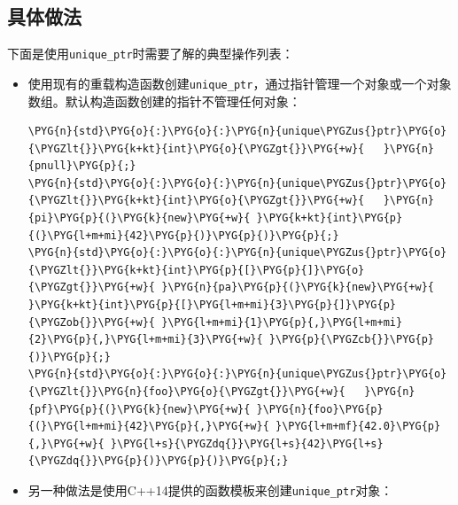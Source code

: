 \subsection{具体做法}



下面是使用\texttt{unique\_\allowbreak{}ptr}时需要了解的典型操作列表：



\begin{itemize}
\item 使用现有的重载构造函数创建\texttt{unique\_\allowbreak{}ptr}，通过指针管理一个对象或一个对象数组。默认构造函数创建的指针不管理任何对象：



\begin{codeblockbg}
\begin{Verbatim}[commandchars=\\\{\},breaklines=true,breakanywhere=true,fontsize=\codefont,xleftmargin=17bp]
\PYG{n}{std}\PYG{o}{:}\PYG{o}{:}\PYG{n}{unique\PYGZus{}ptr}\PYG{o}{\PYGZlt{}}\PYG{k+kt}{int}\PYG{o}{\PYGZgt{}}\PYG{+w}{   }\PYG{n}{pnull}\PYG{p}{;}
\PYG{n}{std}\PYG{o}{:}\PYG{o}{:}\PYG{n}{unique\PYGZus{}ptr}\PYG{o}{\PYGZlt{}}\PYG{k+kt}{int}\PYG{o}{\PYGZgt{}}\PYG{+w}{   }\PYG{n}{pi}\PYG{p}{(}\PYG{k}{new}\PYG{+w}{ }\PYG{k+kt}{int}\PYG{p}{(}\PYG{l+m+mi}{42}\PYG{p}{)}\PYG{p}{)}\PYG{p}{;}
\PYG{n}{std}\PYG{o}{:}\PYG{o}{:}\PYG{n}{unique\PYGZus{}ptr}\PYG{o}{\PYGZlt{}}\PYG{k+kt}{int}\PYG{p}{[}\PYG{p}{]}\PYG{o}{\PYGZgt{}}\PYG{+w}{ }\PYG{n}{pa}\PYG{p}{(}\PYG{k}{new}\PYG{+w}{ }\PYG{k+kt}{int}\PYG{p}{[}\PYG{l+m+mi}{3}\PYG{p}{]}\PYG{p}{\PYGZob{}}\PYG{+w}{ }\PYG{l+m+mi}{1}\PYG{p}{,}\PYG{l+m+mi}{2}\PYG{p}{,}\PYG{l+m+mi}{3}\PYG{+w}{ }\PYG{p}{\PYGZcb{}}\PYG{p}{)}\PYG{p}{;}
\PYG{n}{std}\PYG{o}{:}\PYG{o}{:}\PYG{n}{unique\PYGZus{}ptr}\PYG{o}{\PYGZlt{}}\PYG{n}{foo}\PYG{o}{\PYGZgt{}}\PYG{+w}{   }\PYG{n}{pf}\PYG{p}{(}\PYG{k}{new}\PYG{+w}{ }\PYG{n}{foo}\PYG{p}{(}\PYG{l+m+mi}{42}\PYG{p}{,}\PYG{+w}{ }\PYG{l+m+mf}{42.0}\PYG{p}{,}\PYG{+w}{ }\PYG{l+s}{\PYGZdq{}}\PYG{l+s}{42}\PYG{l+s}{\PYGZdq{}}\PYG{p}{)}\PYG{p}{)}\PYG{p}{;}
\end{Verbatim}
\end{codeblockbg}



\item 另一种做法是使用C++14提供的函数模板来创建\texttt{unique\_\allowbreak{}ptr}对象：




\end{itemize}
